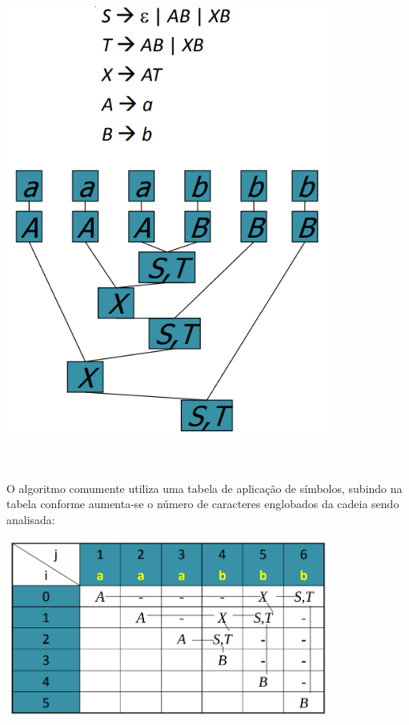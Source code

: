 \documentclass[conference]{IEEEtran}
\begin{document}
\begin{minipage}{\linewidth}
    \centering
    \label{chomsky}
    \includegraphics[width=0.8\textwidth]{cky_tree.png}
\end{minipage}

\

O algoritmo comumente utiliza uma tabela de aplicação de símbolos, subindo na tabela conforme aumenta-se o número de caracteres englobados da cadeia sendo analisada:

\begin{minipage}{\linewidth}
    \centering
    \label{chomsky}
    \includegraphics[width=0.8\textwidth]{cky_table.png}
\end{minipage}
\end{document}
